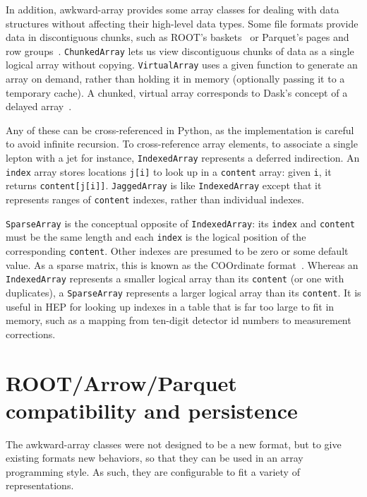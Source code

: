 \documentclass{webofc}
\begin{document}
In addition, awkward-array provides some array classes for dealing with data structures without affecting their high-level data types. Some file formats provide data in discontiguous chunks, such as ROOT's baskets~\cite{root-file} or Parquet's pages and row groups~\cite{parquet-file}. {\tt\small ChunkedArray} lets us view discontiguous chunks of data as a single logical array without copying. {\tt\small VirtualArray} uses a given function to generate an array on demand, rather than holding it in memory (optionally passing it to a temporary cache). A chunked, virtual array corresponds to Dask's concept of a delayed array~\cite{dask}.

Any of these can be cross-referenced in Python, as the implementation is careful to avoid infinite recursion. To cross-reference array elements, to associate a single lepton with a jet for instance, {\tt\small IndexedArray} represents a deferred indirection. An {\tt\small index} array stores locations {\tt\small j[i]} to look up in a {\tt\small content} array: given {\tt\small i}, it returns {\tt\small content[j[i]]}. {\tt\small JaggedArray} is like {\tt\small IndexedArray} except that it represents ranges of {\tt\small content} indexes, rather than individual indexes.

{\tt\small SparseArray} is the conceptual opposite of {\tt\small IndexedArray}: its {\tt\small index} and {\tt\small content} must be the same length and each {\tt\small index} is the logical position of the corresponding {\tt\small content}. Other indexes are presumed to be zero or some default value. As a sparse matrix, this is known as the COOrdinate format~\cite{coo}. Whereas an {\tt\small IndexedArray} represents a smaller logical array than its {\tt\small content} (or one with duplicates), a {\tt\small SparseArray} represents a larger logical array than its {\tt\small content}. It is useful in HEP for looking up indexes in a table that is far too large to fit in memory, such as a mapping from ten-digit detector id numbers to measurement corrections.

\section{ROOT/Arrow/Parquet compatibility and persistence}

The awkward-array classes were not designed to be a new format, but to give existing formats new behaviors, so that they can be used in an array programming style. As such, they are configurable to fit a variety of representations. %
\end{document}

